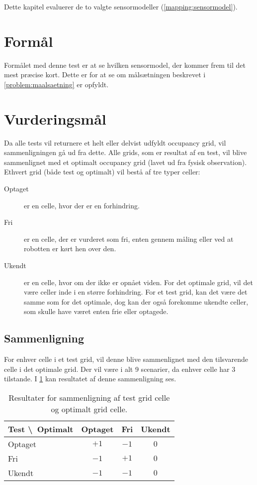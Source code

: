 Dette kapitel evaluerer de to valgte sensormodeller (\cref{mapping:sensormodel}).

\section{Formål}
Formålet med denne test er at se hvilken sensormodel, der kommer frem til det mest præcise kort.
Dette er for at se om målsætningen beskrevet i \cref{problem:maalsaetning} er opfyldt.

\section{Vurderingsmål}
Da alle tests vil returnere et helt eller delvist udfyldt occupancy grid, vil sammenligningen gå ud fra dette.
Alle grids, som er resultat af en test, vil blive sammenlignet med et optimalt occupancy grid (lavet ud fra fysisk observation).
Ethvert grid (både test og optimalt) vil bestå af tre typer celler:
\begin{description}
\item[Optaget]{ er en celle, hvor der er en forhindring.}
\item[Fri]{ er en celle, der er vurderet som fri, enten gennem måling eller ved at robotten er kørt hen over den.}
\item[Ukendt]{ er en celle, hvor om der ikke er opnået viden.
For det optimale grid, vil det være celler inde i en større forhindring.
For et test grid, kan det være det samme som for det optimale, dog kan der også forekomme ukendte celler, som skulle have været enten frie eller optagede.}
\end{description}

\subsection{Sammenligning}
For enhver celle i et test grid, vil denne blive sammenlignet med den tilsvarende celle i det optimale grid.
Der vil være i alt 9 scenarier, da enhver celle har 3 tilstande.
I \cref{evaluering:sammenligning} kan resultatet af denne sammenligning ses.

\begin{table}[h]
\centering
\begin{tabular}{|l|c|c|c|}
\hline
Test \textbackslash~Optimalt & Optaget & Fri & Ukendt \\ \hline
Optaget & $+1$ & $-1$ & $0$ \\ \hline
Fri & $-1$ & $+1$ & $0$ \\ \hline
Ukendt & $-1$ & $-1$ & $0$ \\ \hline
\end{tabular}
\caption{Resultater for sammenligning af test grid celle og optimalt grid celle.}
\label{evaluering:sammenligning}
\end{table}

